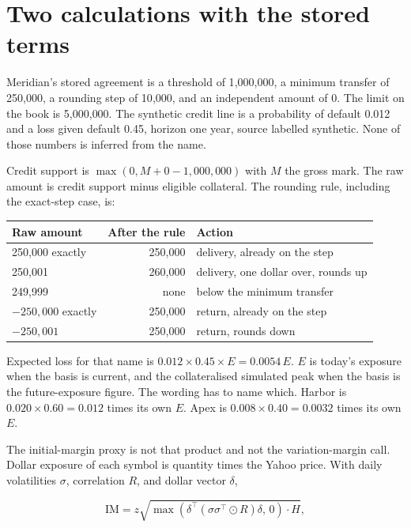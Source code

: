 \documentclass[11pt,a4paper]{article}
\begin{document}
\section{Two calculations with the stored terms}

Meridian's stored agreement is a threshold of 1{,}000{,}000, a minimum transfer of 250{,}000, a rounding step of 10{,}000, and an independent amount of 0. The limit on the book is 5{,}000{,}000. The synthetic credit line is a probability of default 0.012 and a loss given default 0.45, horizon one year, source labelled synthetic. None of those numbers is inferred from the name.

Credit support is $\max(0, M+0-1{,}000{,}000)$ with $M$ the gross mark. The raw amount is credit support minus eligible collateral. The rounding rule, including the exact-step case, is:

\begin{center}
\begin{tabular}{@{}lrl@{}}
\toprule
Raw amount & After the rule & Action \\
\midrule
250{,}000 exactly & 250{,}000 & delivery, already on the step \\
250{,}001 & 260{,}000 & delivery, one dollar over, rounds up \\
249{,}999 & none & below the minimum transfer \\
$-250{,}000$ exactly & 250{,}000 & return, already on the step \\
$-250{,}001$ & 250{,}000 & return, rounds down \\
\bottomrule
\end{tabular}
\end{center}

Expected loss for that name is $0.012\times 0.45\times E=0.0054\,E$. $E$ is today's exposure when the basis is current, and the collateralised simulated peak when the basis is the future-exposure figure. The wording has to name which. Harbor is $0.020\times 0.60=0.012$ times its own $E$. Apex is $0.008\times 0.40=0.0032$ times its own $E$.

The initial-margin proxy is not that product and not the variation-margin call. Dollar exposure of each symbol is quantity times the Yahoo price. With daily volatilities $\sigma$, correlation $R$, and dollar vector $\delta$,

\begin{equation}
\mathrm{IM}=z\sqrt{\max(\delta^{\top}(\sigma\sigma^{\top}\odot R)\delta,\,0)\cdot H},
\end{equation}
\end{document}
